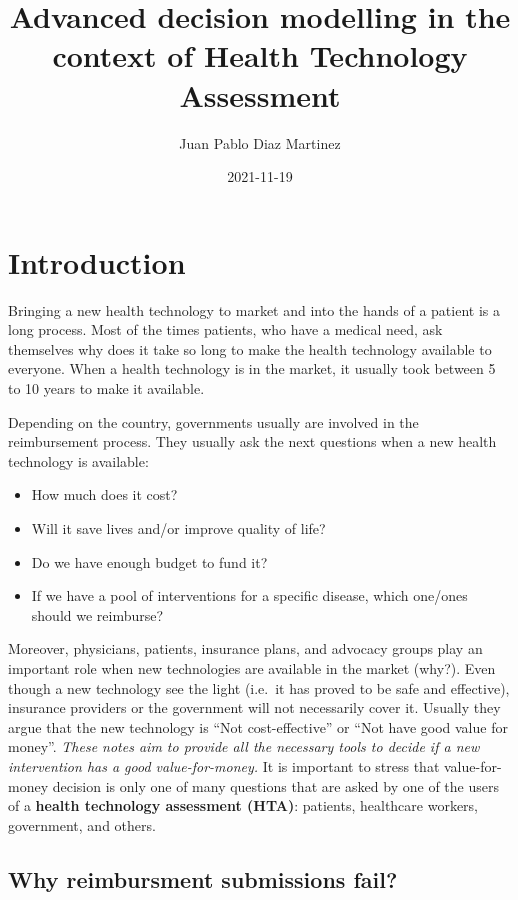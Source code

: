 \documentclass[
]{book}
\title{Advanced decision modelling in the context of Health Technology Assessment}
\author{Juan Pablo Diaz Martinez}
\date{2021-11-19}
\providecommand{\tightlist}{%
  \setlength{\itemsep}{0pt}\setlength{\parskip}{0pt}}
\begin{document}
\maketitle

{
\setcounter{tocdepth}{1}
\tableofcontents
}
\hypertarget{introduction}{%
\chapter*{Introduction}\label{introduction}}

Bringing a new health technology to market and into the hands of a patient is a long process. Most of the times patients, who have a medical need, ask themselves why does it take so long to make the health technology available to everyone. When a health technology is in the market, it usually took between 5 to 10 years to make
it available.

Depending on the country, governments usually are involved in the reimbursement process. They usually ask the next questions when a new health technology is available:

\begin{itemize}
\tightlist
\item
  How much does it cost?
\item
  Will it save lives and/or improve quality of life?
\item
  Do we have enough budget to fund it?
\item
  If we have a pool of interventions for a specific disease, which one/ones should we reimburse?
\end{itemize}

Moreover, physicians, patients, insurance plans, and advocacy groups play an important role when new technologies are available in the market (why?). Even though a new technology see the light (i.e.~it has proved to be safe and effective), insurance providers or the government will not necessarily cover it. Usually they argue that the new technology is ``Not cost-effective'' or ``Not have good value for money''. \emph{These notes aim to provide all the necessary tools to decide if a new intervention has a good value-for-money.} It is important to stress that value-for-money decision is only one of many questions that are asked by one of the users of a \textbf{health technology assessment (HTA)}: patients, healthcare workers, government, and others.

\hypertarget{why-reimbursment-submissions-fail}{%
\section*{Why reimbursment submissions fail?}\label{why-reimbursment-submissions-fail}}
\end{document}
